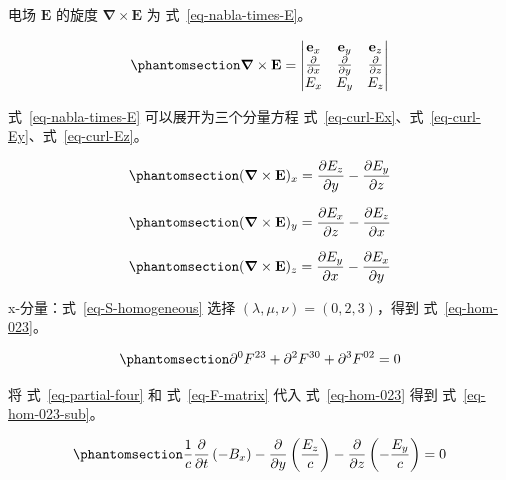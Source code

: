 \documentclass[
  chinese,
  a4paper,
  UTF8,
  12pt,
  oneside,
  openany]{ctexbook}
\theoremstyle{plain}
\theoremstyle{plain}
\theoremstyle{plain}
\theoremstyle{definition}
\theoremstyle{plain}
\theoremstyle{plain}
\theoremstyle{remark}
\begin{document}
电场 \(\mathbf{E}\) 的旋度 \(\boldsymbol{\nabla} \times \mathbf{E}\) 为
式~\ref{eq-nabla-times-E}。

\begin{equation}\protect\phantomsection\label{eq-nabla-times-E}{
\boldsymbol{\nabla} \times \mathbf{E} =
\begin{vmatrix}
\mathbf{e}_x & \mathbf{e}_y & \mathbf{e}_z \\
\frac{\partial}{\partial x} & \frac{\partial}{\partial y} & \frac{\partial}{\partial z} \\
E_x & E_y & E_z
\end{vmatrix}
}\end{equation}

式~\ref{eq-nabla-times-E} 可以展开为三个分量方程
式~\ref{eq-curl-Ex}、式~\ref{eq-curl-Ey}、式~\ref{eq-curl-Ez}。

\begin{equation}\protect\phantomsection\label{eq-curl-Ex}{
(\boldsymbol{\nabla} \times \mathbf{E})_x = \frac{\partial E_z}{\partial y} - \frac{\partial E_y}{\partial z}
}\end{equation}

\begin{equation}\protect\phantomsection\label{eq-curl-Ey}{
(\boldsymbol{\nabla} \times \mathbf{E})_y = \frac{\partial E_x}{\partial z} - \frac{\partial E_z}{\partial x}
}\end{equation}

\begin{equation}\protect\phantomsection\label{eq-curl-Ez}{
(\boldsymbol{\nabla} \times \mathbf{E})_z = \frac{\partial E_y}{\partial x} - \frac{\partial E_x}{\partial y}
}\end{equation}

x-分量：式~\ref{eq-S-homogeneous} 选择
\((\lambda,\mu,\nu) = (0,2,3)\)，得到 式~\ref{eq-hom-023}。

\begin{equation}\protect\phantomsection\label{eq-hom-023}{
\partial^{0}F^{23} + \partial^{2}F^{30} + \partial^{3}F^{02} = 0
}\end{equation}

将 式~\ref{eq-partial-four} 和 式~\ref{eq-F-matrix} 代入
式~\ref{eq-hom-023} 得到 式~\ref{eq-hom-023-sub}。

\begin{equation}\protect\phantomsection\label{eq-hom-023-sub}{
\frac{1}{c}\frac{\partial}{\partial t}\left(- B_x \right) - \frac{\partial}{\partial y}\left(\frac{E_z}{c} \right) - \frac{\partial}{\partial z}\left(- \frac{E_y}{c} \right) = 0
}\end{equation}
\end{document}

